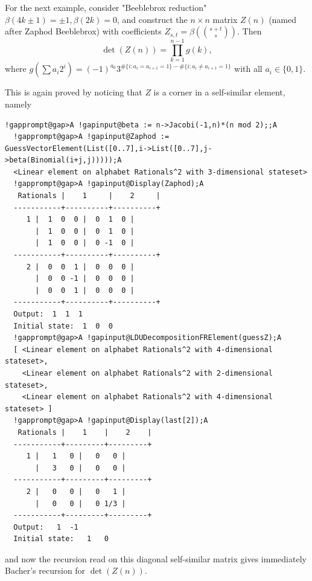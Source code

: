 \documentclass[a4paper,11pt]{report}
\begin{document}
{{ For the next example, consider "Beeblebrox reduction" $\beta(4k\pm1)=\pm1,\beta(2k)=0$, and construct the $n\times n$ matrix $Z(n)$ (named after Zaphod Beeblebrox) with coefficients $Z_{s,t}=\beta({s+t \choose s})$. Then 
\[\det(Z(n))=\prod_{k=1}^{n-1}g(k),\]
 where $g(\sum a_i2^i)=(-1)^{a_0}3^{\#\{i:a_i=a_{i+1}=1\}-\#\{i:a_i\neq a_{i+1}=1\}}$ with all $a_i\in\{0,1\}$. 

 This is again proved by noticing that $Z$ is a corner in a self-similar element, namely 
\begin{Verbatim}[commandchars=!@A,fontsize=\small,frame=single,label=Example]
  !gapprompt@gap>A !gapinput@beta := n->Jacobi(-1,n)*(n mod 2);;A
  !gapprompt@gap>A !gapinput@Zaphod := GuessVectorElement(List([0..7],i->List([0..7],j->beta(Binomial(i+j,j)))));A
  <Linear element on alphabet Rationals^2 with 3-dimensional stateset>
  !gapprompt@gap>A !gapinput@Display(Zaphod);A
   Rationals |    1     |    2     |
  -----------+----------+----------+
  	 1 |  1  0  0 |  0  1  0 |
  	   |  1  0  0 |  0  1  0 |
  	   |  1  0  0 |  0 -1  0 |
  -----------+----------+----------+
  	 2 |  0  0  1 |  0  0  0 |
  	   |  0  0 -1 |  0  0  0 |
  	   |  0  0  1 |  0  0  0 |
  -----------+----------+----------+
  Output:  1  1  1
  Initial state:  1  0  0
  !gapprompt@gap>A !gapinput@LDUDecompositionFRElement(guessZ);A
  [ <Linear element on alphabet Rationals^2 with 4-dimensional stateset>,
    <Linear element on alphabet Rationals^2 with 2-dimensional stateset>,
    <Linear element on alphabet Rationals^2 with 4-dimensional stateset> ]
  !gapprompt@gap>A !gapinput@Display(last[2]);A
   Rationals |    1    |    2    |
  -----------+---------+---------+
  	 1 |   1   0 |   0   0 |
  	   |   3   0 |   0   0 |
  -----------+---------+---------+
  	 2 |   0   0 |   0   1 |
  	   |   0   0 |   0 1/3 |
  -----------+---------+---------+
  Output:   1  -1
  Initial state:   1   0
\end{Verbatim}
 and now the recursion read on this diagonal self-similar matrix gives
immediately Bacher's recursion for $\det(Z(n))$. 

}}
\end{document}
